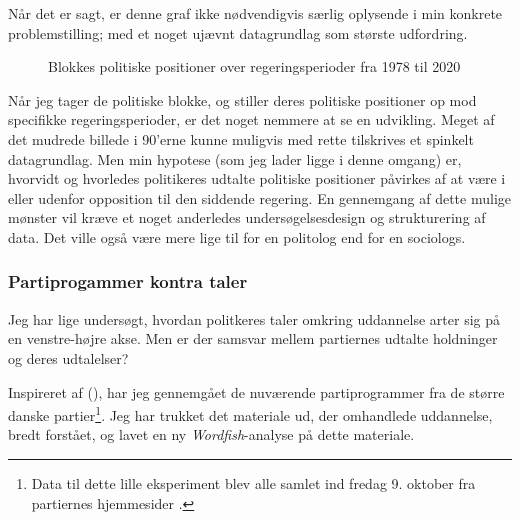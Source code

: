 Når det er sagt, er denne graf ikke nødvendigvis særlig oplysende i min konkrete problemstilling; med et noget ujævnt datagrundlag som største udfordring.

\begin{figure}
\begin{adjustwidth}{-1.65in}{-1.5in}
 
\end{adjustwidth}
\caption{Blokkes politiske positioner over regeringsperioder fra 1978 til 2020}
\label{fig:fish_blocsXgovt}
\end{figure}

Når jeg tager de politiske blokke, og stiller deres politiske positioner op mod specifikke regeringsperioder, er det noget nemmere at se en udvikling.
Meget af det mudrede billede i 90'erne kunne muligvis med rette tilskrives et spinkelt datagrundlag.
Men min hypotese (som jeg lader ligge i denne omgang) er, hvorvidt og hvorledes politikeres udtalte politiske positioner påvirkes af at være i eller udenfor opposition til den siddende regering.
En gennemgang af dette mulige mønster vil kræve et noget anderledes undersøgelsesdesign og strukturering af data.
Det ville også være mere lige til for en politolog end for en sociologs.

\subsubsection{Partiprogammer kontra taler}

Jeg har lige undersøgt, hvordan politkeres taler omkring uddannelse arter sig på en venstre-højre akse.
Men er der samsvar mellem partiernes udtalte holdninger og deres udtalelser?

Inspireret af \citeauthor{slapinScalingModelEstimating2008} (\citeyear{slapinScalingModelEstimating2008}), har jeg gennemgået de nuværende partiprogrammer fra de større danske partier\footnote{Data til dette lille eksperiment blev alle samlet ind fredag 9. oktober fra partiernes hjemmesider \autocite{enhedslistenUddannelseOgForskning2020, socialistiskfolkepartiSkoleUddannelseOg2020, socialdemokratietErhvervsuddannelserSocialdemokratiet2020, socialdemokratietGymnasiumSocialdemokratiet2020, socialdemokratietVideregaendeUddannelseSocialdemokratiet2020, socialdemokratietUddannelseSocialdemokratietsUddannelsespolitik2020, radikalevenstreUngeOgUddannelse2020, detkonservativefolkepartiUddannelseOgSkole2020,venstrePrincipprogram20162016, danskfolkepartiDanskFolkepartisPrincipprogram2020, danskfolkepartiUddannelseDanskFolkeparti2020}.}.
Jeg har trukket det materiale ud, der omhandlede uddannelse, bredt forstået, og lavet en ny \textit{Wordfish}-analyse på dette materiale.

